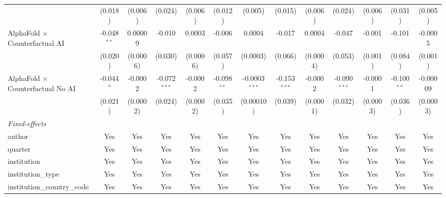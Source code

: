 \begin{tabular}{lcccccccccccc}
                                            & (0.018)       & (0.006)   & (0.024)        & (0.006)  & (0.012)       & (0.005)         & (0.015)        & (0.006)      & (0.024)        & (0.006)      & (0.031)       & (0.005)\\   
   AlphaFold $\times$ Counterfactual AI     & -0.048$^{**}$ & 0.00009   & -0.010         & 0.0003   & -0.006        & 0.0004          & -0.017         & 0.0004       & -0.047         & -0.001       & -0.101        & -0.0005\\   
                                            & (0.020)       & (0.0006)  & (0.030)        & (0.0006) & (0.057)       & (0.0003)        & (0.066)        & (0.0004)     & (0.053)        & (0.001)      & (0.084)       & (0.001)\\   
   AlphaFold $\times$ Counterfactual No AI  & -0.044$^{*}$  & -0.0002   & -0.072$^{***}$ & -0.0002  & -0.098$^{**}$ & -0.0003$^{***}$ & -0.153$^{***}$ & -0.0002      & -0.090$^{***}$ & -0.0001      & -0.100$^{**}$ & -0.00009\\   
                                            & (0.021)       & (0.0002)  & (0.024)        & (0.0002) & (0.035)       & (0.00010)       & (0.039)        & (0.0001)     & (0.032)        & (0.0003)     & (0.036)       & (0.0003)\\   
   \midrule
   \emph{Fixed-effects}\\
   author                                   & Yes           & Yes       & Yes            & Yes      & Yes           & Yes             & Yes            & Yes          & Yes            & Yes          & Yes           & Yes\\  
   quarter                                  & Yes           & Yes       & Yes            & Yes      & Yes           & Yes             & Yes            & Yes          & Yes            & Yes          & Yes           & Yes\\  
   institution                              & Yes           & Yes       & Yes            & Yes      & Yes           & Yes             & Yes            & Yes          & Yes            & Yes          & Yes           & Yes\\  
   institution\_type                        & Yes           & Yes       & Yes            & Yes      & Yes           & Yes             & Yes            & Yes          & Yes            & Yes          & Yes           & Yes\\  
   institution\_country\_code               & Yes           & Yes       & Yes            & Yes      & Yes           & Yes             & Yes            & Yes          & Yes            & Yes          & Yes           & Yes\\  

\end{tabular}
